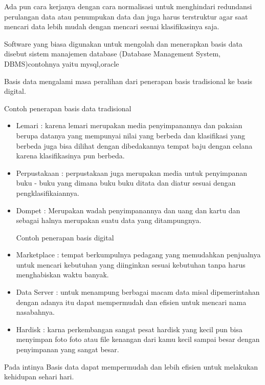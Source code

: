 \documentclass[12pt]{article}
\begin{document}
Ada pun cara kerjanya dengan cara normalisasi untuk menghindari redundansi perulangan data atau penumpukan data dan juga harus terstruktur agar saat mencari data lebih mudah dengan mencari sesuai klasifikasinya saja.

Software yang biasa digunakan untuk mengolah dan menerapkan basis data disebut sistem manajemen database (Database Management System, DBMS)contohnya yaitu mysql,oracle

Basis data mengalami masa peralihan dari penerapan basis tradisional ke basis digital.

Contoh penerapan basis data tradisional

\begin{itemize}
  \item Lemari : karena lemari merupakan media penyimpanannya dan pakaian berupa datanya yang mempunyai nilai yang berbeda dan klasifikasi yang berbeda juga bisa dilihat dengan dibedakannya tempat baju dengan celana karena klasifikasinya pun berbeda.
  \item Perpustakaan : perpustakaan juga merupakan media untuk penyimpanan buku - buku yang dimana buku buku ditata dan diatur sesuai dengan pengklasifikaiannya.
  \item Dompet : Merupakan wadah penyimpanannya dan uang dan kartu dan sebagai halnya merupakan suatu data yang ditampungnya.
        \hspace*{3cm}
            
Contoh penerapan basis digital

  \item Marketplace : tempat berkumpulnya pedagang yang memudahkan penjualnya untuk mencari kebutuhan yang diinginkan sesuai kebutuhan tanpa harus menghabiskan waktu banyak.
  \item Data Server : untuk menampung berbagai macam data misal dipemerintahan dengan adanya itu dapat mempermudah dan efisien untuk mencari nama nasabahnya.
  \item Hardisk : karna perkembangan sangat pesat hardisk yang kecil pun bisa menyimpan foto foto atau file kenangan dari kamu kecil sampai besar dengan penyimpanan yang sangat besar.
\end{itemize}

Pada intinya Basis data dapat mempermudah dan lebih efisien untuk melakukan kehidupan sehari hari.
\end{document}
